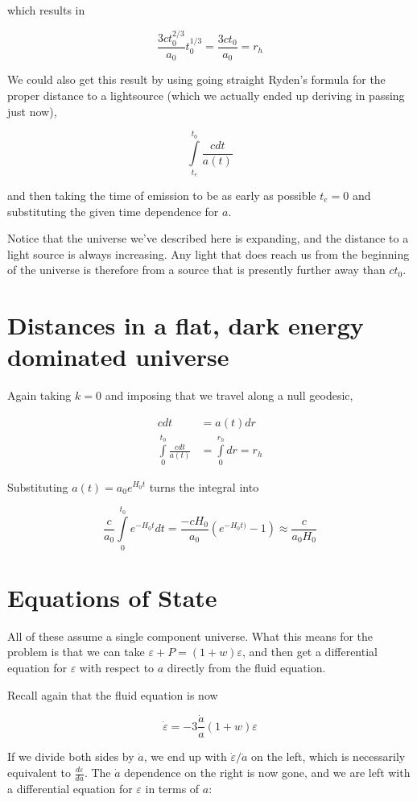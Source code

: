 \documentclass[12pt]{article}
\begin{document}
which results in 

\[ \frac{3ct_0^{2/3}}{a_0}t_0^{1/3} = \frac{3ct_0}{a_0}= r_h
\]

We could also get this result by using going straight Ryden's formula for the proper distance to a lightsource (which we actually ended up deriving in passing just now),

\[ \int\limits_{t_e}^{t_0}\frac{cdt}{a(t)}
\]

and then taking the time of emission to be as early as possible \(t_e = 0\) and substituting the given time dependence for \(a\).


Notice that the universe we've described here is expanding, and the distance to a light source is always increasing. Any light that does reach us from the beginning of the universe is therefore from a source that is presently further away than \(ct_0\).

\section{Distances in a flat, dark energy dominated universe}

Again taking \(k=0\) and imposing that we travel along a null geodesic,

\begin{align*}
cdt&=a(t)dr \\
\int\limits_0^{t_0}\frac{cdt}{a(t)} &= \int\limits_0^{r_h}dr = r_h
\end{align*}

Substituting \(a(t) = a_0e^{H_0t}\) turns the integral into

\[ \frac{c}{a_0}\int\limits_0^{t_0}e^{-H_0t}dt = \frac{-cH_0}{a_0}(e^{-H_0t)}-1) \approx \boxed{\frac{c}{a_0H_0}}
\]

\section{Equations of State}

All of these assume a single component universe. What this means for the problem is that we can take \(\varepsilon +P = (1+w)\varepsilon\), and then get a differential equation for \(\varepsilon\) with respect to \(a\) directly from the fluid equation.

Recall again that the fluid equation is now

\[\dot{\varepsilon} = -3\frac{\dot{a}}{a}(1+w)\varepsilon
\]

If we divide both sides by \(\dot{a}\), we end up with \(\dot{\varepsilon}/\dot{a}\) on the left, which is necessarily equivalent to \(\frac{d\varepsilon}{da}\). The \(\dot{a}\) dependence on the right is now gone, and we are left with a differential equation for \(\varepsilon\) in terms of \(a\):
\end{document}
